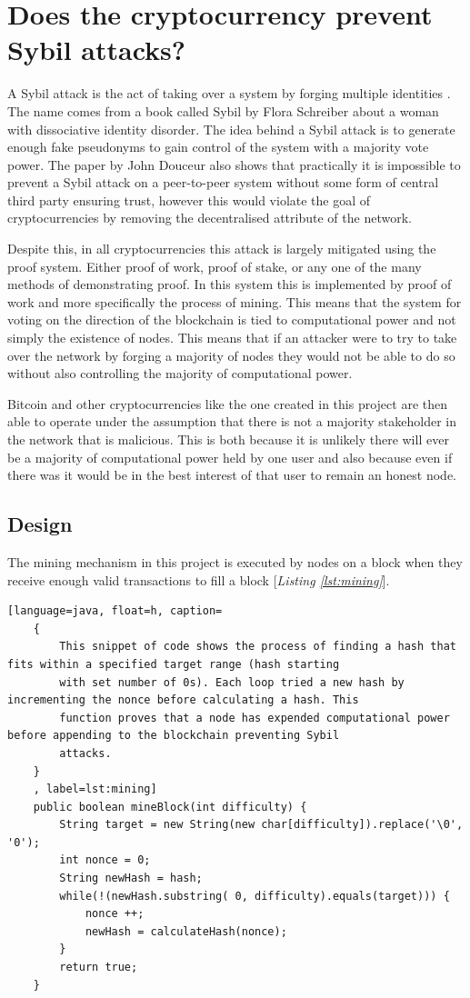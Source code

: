 \documentclass{l4proj}
\begin{document}
\section{Does the cryptocurrency prevent Sybil attacks?}
A Sybil attack is the act of taking over a system by forging multiple identities \citep{douceur2002sybil}. The name comes from a book
called Sybil by Flora Schreiber \citep{schreiber1973sybil} about a woman with dissociative identity disorder. The idea behind a Sybil attack is to 
generate enough fake pseudonyms to gain control of the system with a majority vote power. The paper by John Douceur 
also shows that practically it is impossible to prevent a Sybil attack on a peer-to-peer system \citep{douceur2002sybil} without some
form of central third party ensuring trust, however this would violate the goal of cryptocurrencies by removing the decentralised
attribute of the network.

Despite this, in all cryptocurrencies this attack is largely mitigated using the proof system. Either proof of work, proof of stake, or any one
of the many methods of demonstrating proof. In this system this is implemented by proof of work and more specifically
the process of mining. This means that the system for voting on the direction of the blockchain is tied to computational 
power and not simply the existence of nodes. This means that if an attacker were to try to take over the network by 
forging a majority of nodes they would not be able to do so without also controlling the majority of computational power.

Bitcoin and other cryptocurrencies like the one created in this project are then able to operate under the assumption
that there is not a majority stakeholder in the network that is malicious. This is both because it is unlikely there will
ever be a majority of computational power held by one user and also because even if there was it would be in the best 
interest of that user to remain an honest node.

\subsection{Design}
The mining mechanism in this project is executed by nodes on a block when they receive enough valid transactions to
fill a block [\textit{Listing \ref{lst:mining}}].

\begin{lstlisting}[language=java, float=h, caption=
    {
        This snippet of code shows the process of finding a hash that fits within a specified target range (hash starting
        with set number of 0s). Each loop tried a new hash by incrementing the nonce before calculating a hash. This 
        function proves that a node has expended computational power before appending to the blockchain preventing Sybil
        attacks.
    }
    , label=lst:mining]
    public boolean mineBlock(int difficulty) {
        String target = new String(new char[difficulty]).replace('\0', '0');
        int nonce = 0; 
        String newHash = hash;
		while(!(newHash.substring( 0, difficulty).equals(target))) {
            nonce ++;
			newHash = calculateHash(nonce);
        }
        return true;
    }
\end{lstlisting}
\end{document}
